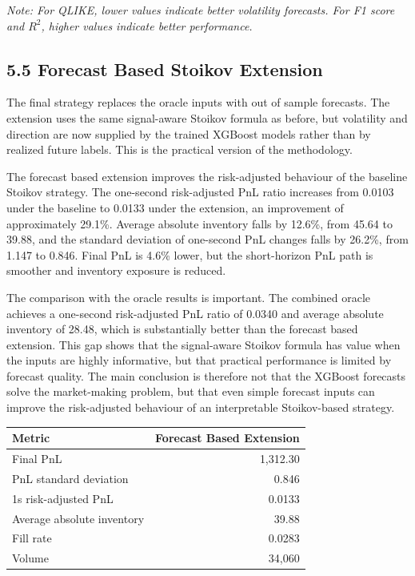 \documentclass[12pt,a4paper]{article}
\begin{document}
\emph{Note: For QLIKE, lower values indicate better volatility
forecasts. For F1 score and \(R^2\), higher values indicate better
performance.}

\subsection{5.5 Forecast Based Stoikov
Extension}\label{forecast-based-stoikov-extension}

The final strategy replaces the oracle inputs with out of sample
forecasts. The extension uses the same signal-aware Stoikov formula as
before, but volatility and direction are now supplied by the trained
XGBoost models rather than by realized future labels. This is the
practical version of the methodology.

The forecast based extension improves the risk-adjusted behaviour of the
baseline Stoikov strategy. The one-second risk-adjusted PnL ratio
increases from 0.0103 under the baseline to 0.0133 under the extension,
an improvement of approximately 29.1\%. Average absolute inventory falls
by 12.6\%, from 45.64 to 39.88, and the standard deviation of one-second
PnL changes falls by 26.2\%, from 1.147 to 0.846. Final PnL is 4.6\%
lower, but the short-horizon PnL path is smoother and inventory exposure
is reduced.

The comparison with the oracle results is important. The combined oracle
achieves a one-second risk-adjusted PnL ratio of 0.0340 and average
absolute inventory of 28.48, which is substantially better than the
forecast based extension. This gap shows that the signal-aware Stoikov
formula has value when the inputs are highly informative, but that
practical performance is limited by forecast quality. The main
conclusion is therefore not that the XGBoost forecasts solve the
market-making problem, but that even simple forecast inputs can improve
the risk-adjusted behaviour of an interpretable Stoikov-based strategy.

\begingroup\small{}\setlength{\tabcolsep}{4pt}
\begin{longtable}[]{@{}lr@{}}
\toprule\noalign{}
Metric & Forecast Based Extension \\
\midrule\noalign{}
\endhead
\bottomrule\noalign{}
\endlastfoot
Final PnL & 1,312.30 \\
PnL standard deviation & 0.846 \\
1s risk-adjusted PnL & 0.0133 \\
Average absolute inventory & 39.88 \\
Fill rate & 0.0283 \\
Volume & 34,060 \\
\end{longtable}
\endgroup
\end{document}
